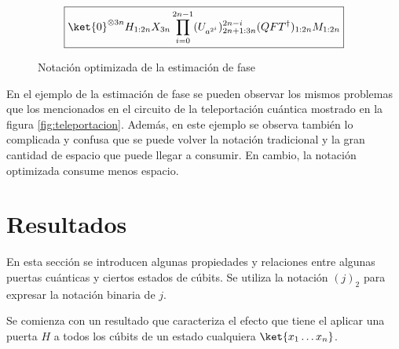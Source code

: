 \documentclass[10pt,conference,a4paper]{IEEEtran}
\begin{document}
    \begin{figure}[htb!]
        $$\boxed{\ket{0}^{\otimes 3n}H_{1:2n}X_{3n}\displaystyle\prod_{i=0}^{2n-1}(U_{a^{2^i}})_{2n+1:3n}^{2n-i}(QFT^{\dagger})_{1:2n}M_{1:2n}}$$
        \caption{Notación optimizada de la estimación de fase}
        \label{Fig11}
    \end{figure}


    En el ejemplo de la estimación de fase se pueden observar los mismos problemas que los mencionados en el circuito de la teleportación cuántica  mostrado en la figura \ref{fig:teleportacion}. Además, en este ejemplo se observa también lo complicada y confusa que se puede volver la notación tradicional y la gran cantidad de espacio que puede llegar a consumir. En cambio, la  notación  optimizada consume menos espacio.%

    \section{Resultados}
    \label{seccion:5}
    En esta sección se introducen algunas propiedades y relaciones entre algunas puertas cuánticas y ciertos estados de cúbits. Se utiliza  la notación $(j)_2$ para expresar la notación binaria de $j$.%

    Se comienza con un resultado que caracteriza el efecto que tiene el aplicar una puerta $H$ a todos los cúbits de un estado cualquiera $\ket{x_{1}\ldots x_{n}}$.
\end{document}
